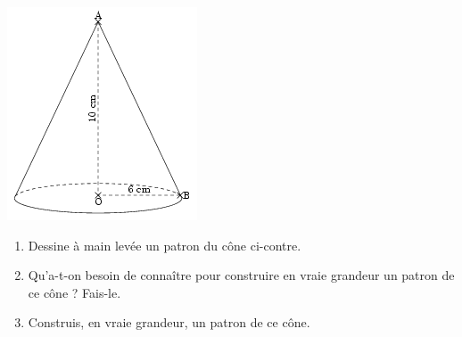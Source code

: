 
\begin{center}
\includegraphics[scale=1]{RepS-26.png} 
\end{center}
 
  \begin{enumerate}
    \item Dessine à main levée un patron du cône ci-contre.
    \item Qu'a-t-on besoin de connaître pour construire en vraie grandeur un patron de ce cône ? Fais-le.
    \item Construis, en vraie grandeur, un patron de ce cône.
  \end{enumerate}


